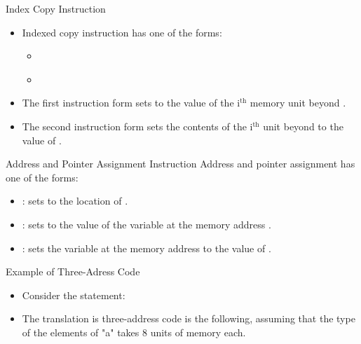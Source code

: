 \begin{bibunit}[apalike]
\begin{frame}{Index Copy Instruction}
	\begin{itemize}
	\item Indexed copy instruction has one of the forms:
		\begin{itemize}
		\item \emph{}
		\item \emph{}
		\end{itemize}
	\vfill
	\item The first instruction form sets  to the value of the i$^{\text{th}}$ memory unit beyond .
	\vfill
	\item The second instruction form sets the contents of the i$^{\text{th}}$ unit beyond  to the value of .
	\end{itemize}
\end{frame}

\begin{frame}{Address and Pointer Assignment Instruction}
	Address and pointer assignment has one of the forms:
	\vfill
	\begin{itemize}
	\item \emph{}: sets  to the location of .
	\vfill
	\item \emph{}: sets  to the value of the variable at the memory address .
	\vfill
	\item \emph{}: sets the variable at the memory address  to the value of .
	\end{itemize}
\end{frame}

\begin{frame}{Example of Three-Adress Code}
	\begin{itemize}
	\item Consider the statement:
		\begin{center}
		\end{center}
	\item The translation is three-address code is the following, assuming that the type of the elements of "a" takes 8 units of memory each.
	\end{itemize}
	\begin{center}
	\begin{tac}[.5\linewidth]
	\end{tac}
	\end{center}
\end{frame}


\end{bibunit}
